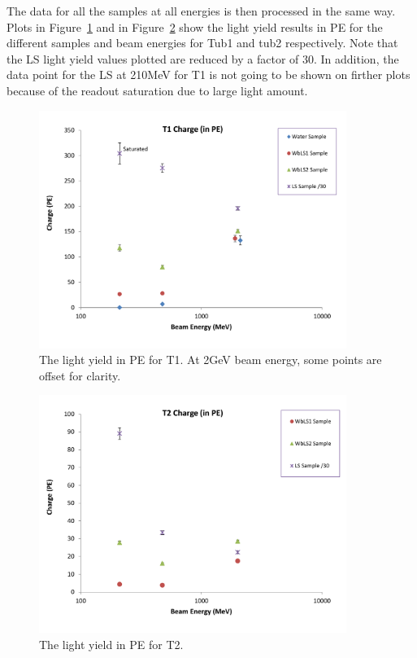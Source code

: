\documentclass[preprint,12pt]{elsarticle}
\begin{document}
The data for all the samples at all energies is then processed in the same way. Plots in Figure~\ref{tub1signalInPE} and in Figure~\ref{tub2signalInPE} show the light yield results in PE for the different samples and beam energies for Tub1 and tub2 respectively. Note that the LS light yield values plotted are reduced by a factor of 30. In addition, the data point for the LS at 210MeV for T1 is not going to be shown on firther plots because of the readout saturation due to large light amount.

\begin{figure}[ht]
	\centering
		\includegraphics[width=100mm]{tub1signalInPE.pdf}
	\caption{The light yield in PE for T1. At 2GeV beam energy, some points are offset for clarity.}
	\label{tub1signalInPE}
\end{figure}

\begin{figure}[ht]
	\centering
		\includegraphics[width=100mm]{tub2signalInPE.pdf}
	\caption{The light yield in PE for T2.}
	\label{tub2signalInPE}
\end{figure}
\end{document}
